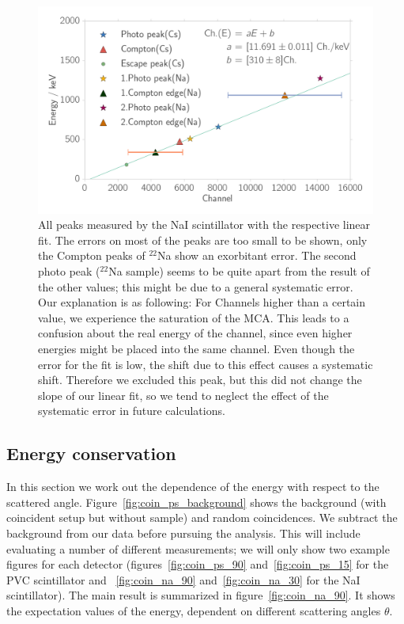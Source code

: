 \begin{figure}[htpb]
    \centering
    \includegraphics[width=0.9\linewidth]{./analysis/figures/calibration_na_linear_fit}
    \caption{All peaks measured by the NaI scintillator with the respective linear fit. The errors on 
        most of the peaks are too small to be shown, only the Compton peaks of $^{22}$Na show
        an exorbitant error. The second photo peak ($^{22}$Na sample) seems to be quite apart from
    the result of the other values; this might be due to a general systematic error. Our explanation is as following: 
    For Channels higher than a certain value, we experience the saturation of the MCA. This leads to a confusion about the
    real energy of the channel, since even higher energies might be placed into the same channel. Even though the error for the
    fit is low, the shift due to this effect causes a systematic shift. Therefore we excluded this peak, but this did not 
    change the slope of our linear fit, so we tend to neglect the effect of the systematic error in future calculations. }

\label{fig:calibration_na_linear_fit}
\end{figure}
\clearpage
\subsection{Energy conservation}
\label{sub:energy_conservation}
In this section we work out the dependence of the energy with respect to the scattered
angle. Figure~\ref{fig:coin_ps_background} shows the background (with
coincident setup but without sample) and random coincidences.
We subtract the background from our data before pursuing the analysis.
This will include evaluating a number of different measurements; we will
only show two example figures for each detector 
(figures~\ref{fig:coin_ps_90} and~\ref{fig:coin_ps_15} for the PVC scintillator and 
~\ref{fig:coin_na_90} and~\ref{fig:coin_na_30} for the NaI scintillator). The main
result is summarized in figure~\ref{fig:coin_na_90}. It shows the expectation values of
the energy, dependent on different scattering angles $\theta$.


